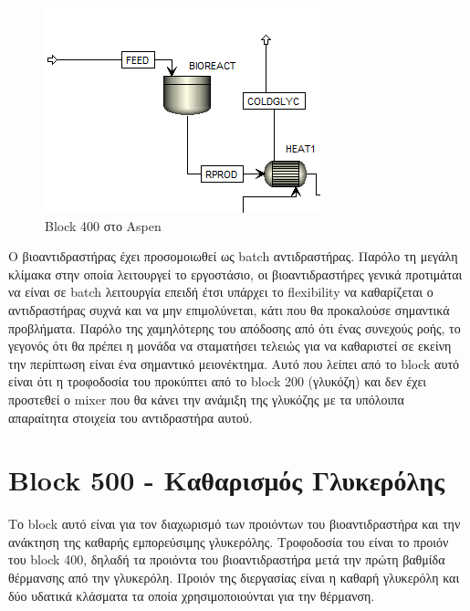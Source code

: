 \documentclass[11pt]{article}
\begin{document}
\begin{figure}[htbp]
\centering
\includegraphics[width=.9\linewidth]{Block_400_-_Παραγωγή_Γλυκερόλης/2023-01-10_19-01-02_screenshot.png}
\caption{Block 400 στο Aspen}
\end{figure}

Ο βιοαντιδραστήρας έχει προσομοιωθεί ως batch αντιδραστήρας. Παρόλο τη μεγάλη κλίμακα στην οποία λειτουργεί το εργοστάσιο, οι βιοαντιδραστήρες γενικά προτιμάται να είναι σε batch λειτουργία επειδή έτσι υπάρχει το flexibility να καθαρίζεται ο αντιδραστήρας συχνά και να μην επιμολύνεται, κάτι που θα προκαλούσε σημαντικά προβλήματα. Παρόλο της χαμηλότερης του απόδοσης από ότι ένας συνεχούς ροής, το γεγονός ότι θα πρέπει η μονάδα να σταματήσει τελειώς για να καθαριστεί σε εκείνη την περίπτωση είναι ένα σημαντικό μειονέκτημα. Αυτό που λείπει από το block αυτό είναι ότι η τροφοδοσία του προκύπτει από το block 200 (γλυκόζη) και δεν έχει προστεθεί ο mixer που θα κάνει την ανάμιξη της γλυκόζης με τα υπόλοιπα απαραίτητα στοιχεία του αντιδραστήρα αυτού.

\section{Block 500 - Καθαρισμός Γλυκερόλης}
\label{sec:org0dd7763}
Το block αυτό είναι για τον διαχωρισμό των προιόντων του βιοαντιδραστήρα και την ανάκτηση της καθαρής εμπορεύσιμης γλυκερόλης. Τροφοδοσία του είναι το προιόν του block 400, δηλαδή τα προιόντα του βιοαντιδραστήρα μετά την πρώτη βαθμίδα θέρμανσης από την γλυκερόλη. Προιόν της διεργασίας είναι η καθαρή γλυκερόλη και δύο υδατικά κλάσματα τα οποία χρησιμοποιούνται για την θέρμανση.
\end{document}
